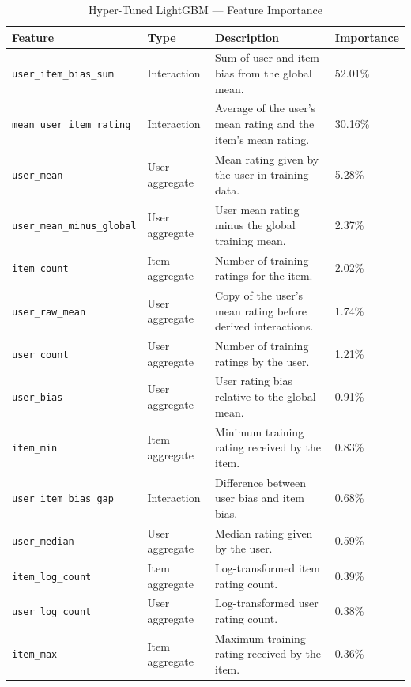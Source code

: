 \documentclass[conference]{IEEEtran}
\begin{document}
\begin{table}[htbp]
\caption{Hyper-Tuned LightGBM --- Feature Importance}
\label{tab:tuned-lgbm-feature-importance}
\centering
\scriptsize
\setlength{\tabcolsep}{3pt}
\renewcommand{\arraystretch}{1.12}
\begin{tabular}{p{6.5cm}p{2.4cm}p{7.1cm}p{1.3cm}}
\toprule
\textbf{Feature} & \textbf{Type} & \textbf{Description} & \textbf{Importance} \\
\midrule
\raggedright\texttt{user\_item\_bias\_sum} & Interaction & Sum of user and item bias from the global mean. & 52.01\% \\
\raggedright\texttt{mean\_user\_item\_rating} & Interaction & Average of the user's mean rating and the item's mean rating. & 30.16\% \\
\raggedright\texttt{user\_mean} & User aggregate & Mean rating given by the user in training data. & 5.28\% \\
\raggedright\texttt{user\_mean\_minus\_global} & User aggregate & User mean rating minus the global training mean. & 2.37\% \\
\raggedright\texttt{item\_count} & Item aggregate & Number of training ratings for the item. & 2.02\% \\
\raggedright\texttt{user\_raw\_mean} & User aggregate & Copy of the user's mean rating before derived interactions. & 1.74\% \\
\raggedright\texttt{user\_count} & User aggregate & Number of training ratings by the user. & 1.21\% \\
\raggedright\texttt{user\_bias} & User aggregate & User rating bias relative to the global mean. & 0.91\% \\
\raggedright\texttt{item\_min} & Item aggregate & Minimum training rating received by the item. & 0.83\% \\
\raggedright\texttt{user\_item\_bias\_gap} & Interaction & Difference between user bias and item bias. & 0.68\% \\
\raggedright\texttt{user\_median} & User aggregate & Median rating given by the user. & 0.59\% \\
\raggedright\texttt{item\_log\_count} & Item aggregate & Log-transformed item rating count. & 0.39\% \\
\raggedright\texttt{user\_log\_count} & User aggregate & Log-transformed user rating count. & 0.38\% \\
\raggedright\texttt{item\_max} & Item aggregate & Maximum training rating received by the item. & 0.36\% \\

\end{tabular}
\end{table}
\end{document}
